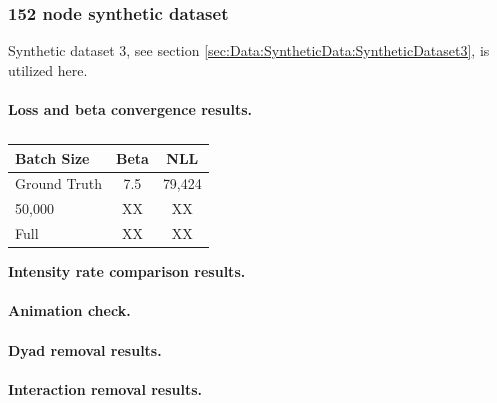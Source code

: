 






\subsubsection{152 node synthetic dataset}
\label{sec:ResearchQuestion2:150nodeSynthetic}

Synthetic dataset 3, see section \ref{sec:Data:SyntheticData:SyntheticDataset3}, is utilized here.
\\\\
\textbf{Loss and beta convergence results.}

\begin{table}[h!]
\centering
\begin{tabular}{|l|cc|}
\hline
Batch Size   & Beta & NLL\\ \hline
Ground Truth & 7.5  & 79,424      \\
50,000          & XX   & XX       \\
Full          & XX   & XX       \\
\hline
\end{tabular}
\caption{}
\label{tab:SingleStep1}
\end{table}
\noindent \textbf{Intensity rate comparison results.}
\\\\
\textbf{Animation check.}
\\\\
\textbf{Dyad removal results.}
\\\\
\textbf{Interaction removal results.}
   



